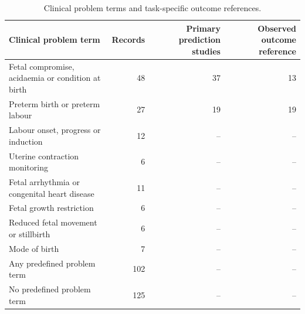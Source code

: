 \begin{table}[!t]
\caption{Clinical problem terms and task-specific outcome references.}
\label{tab:clinical}
\centering
\footnotesize
\begin{tabularx}{\textwidth}{@{}Yrrr@{}}
\toprule
Clinical problem term & Records & Primary prediction studies & Observed outcome reference \\
\midrule
Fetal compromise, acidaemia or condition at birth & 48 & 37 & 13 \\
Preterm birth or preterm labour & 27 & 19 & 19 \\
Labour onset, progress or induction & 12 & -- & -- \\
Uterine contraction monitoring & 6 & -- & -- \\
Fetal arrhythmia or congenital heart disease & 11 & -- & -- \\
Fetal growth restriction & 6 & -- & -- \\
Reduced fetal movement or stillbirth & 6 & -- & -- \\
Mode of birth & 7 & -- & -- \\
\midrule
Any predefined problem term & 102 & -- & -- \\
No predefined problem term & 125 & -- & -- \\
\bottomrule
\end{tabularx}
\end{table}
